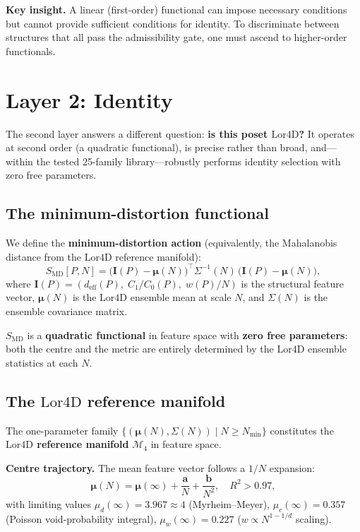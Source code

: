 \documentclass[12pt,a4paper]{article}
\newcommand{\SMD}{S_{\mathrm{MD}}}
\newcommand{\deff}{d_{\mathrm{eff}}}
\newcommand{\Lor}{\mathrm{Lor4D}}
\begin{document}
\textbf{Key insight.}
A linear (first-order) functional can impose necessary conditions but cannot
provide sufficient conditions for identity.
To discriminate between structures that all pass the admissibility gate, one must
ascend to higher-order functionals.

\section{Layer 2: Identity}
\label{sec:layer2}

The second layer answers a different question: \textbf{is this poset $\Lor$?}
It operates at second order (a quadratic functional), is precise rather than
broad, and---within the tested 25-family library---robustly performs identity
selection with zero free parameters.

\subsection{The minimum-distortion functional}

We define the \textbf{minimum-distortion action} (equivalently, the Mahalanobis
distance from the $\Lor$ reference manifold):
\begin{equation}\label{eq:SMD}
  \SMD[P,N] = \bigl(\mathbf{I}(P) - \bm{\mu}(N)\bigr)^\top
  \Sigma^{-1}(N)\,\bigl(\mathbf{I}(P) - \bm{\mu}(N)\bigr),
\end{equation}
where $\mathbf{I}(P) = (\deff(P),\;C_1/C_0(P),\;w(P)/N)$ is the structural
feature vector, $\bm{\mu}(N)$ is the $\Lor$ ensemble mean at scale $N$, and
$\Sigma(N)$ is the ensemble covariance matrix.

$\SMD$ is a \textbf{quadratic functional} in feature space with \textbf{zero
free parameters}: both the centre and the metric are entirely determined by the
$\Lor$ ensemble statistics at each $N$.

\subsection{\texorpdfstring{The $\Lor$ reference manifold}{The Lor reference manifold}}

The one-parameter family
$\{(\bm{\mu}(N),\Sigma(N))\mid N\geq N_{\min}\}$ constitutes the \textbf{$\Lor$
reference manifold} $\mathcal{M}_4$ in feature space.

\textbf{Centre trajectory.}
The mean feature vector follows a $1/N$ expansion:
\begin{equation}
  \bm{\mu}(N) = \bm{\mu}(\infty) + \frac{\mathbf{a}}{N}
  + \frac{\mathbf{b}}{N^2},\quad R^2 > 0.97,
\end{equation}
with limiting values $\mu_d(\infty)=3.967\approx 4$ (Myrheim--Meyer),
$\mu_c(\infty)=0.357$ (Poisson void-probability integral),
$\mu_w(\infty)=0.227$ ($w\propto N^{1-1/d}$ scaling).
\end{document}
